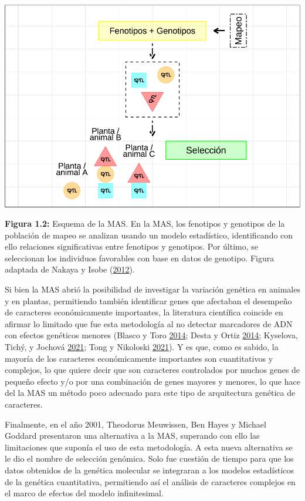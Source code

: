 \documentclass[11pt,spanish,a4paper,oneside,]{book} %
\begin{document}
\begin{center}\includegraphics[width=1\linewidth]{figures/MAS} \end{center}

\begin{center}
\textbf{Figura 1.2:} Esquema de la MAS. En la MAS, los fenotipos y genotipos de la población de mapeo se analizan usando un modelo estadístico, identificando con ello relaciones significativas entre fenotipos y genotipos. Por último, se seleccionan los individuos favorables con base en datos de genotipo. Figura adaptada de Nakaya y Isobe (\protect\hyperlink{ref-cite:6}{2012}).

\end{center}

Si bien la MAS abrió la posibilidad de investigar la variación genética en animales y en plantas, permitiendo también identificar genes que afectaban el desempeño de caracteres económicamente importantes, la literatura científica coincide en afirmar lo limitado que fue esta metodología al no detectar marcadores de ADN con efectos genéticos menores (Blasco y Toro \protect\hyperlink{ref-cite:3}{2014}; Desta y Ortiz \protect\hyperlink{ref-cite:10}{2014}; Kyselova, Tichý, y Jochová \protect\hyperlink{ref-cite:32}{2021}; Tong y Nikoloski \protect\hyperlink{ref-cite:7}{2021}). Y es que, como es sabido, la mayoría de los caracteres económicamente importantes son cuantitativos y complejos, lo que quiere decir que son caracteres controlados por muchos genes de pequeño efecto y/o por una combinación de genes mayores y menores, lo que hace del la MAS un método poco adecuado para este tipo de arquitectura genética de caracteres.

Finalmente, en el año 2001, Theodorus Meuwissen, Ben Hayes y Michael Goddard presentaron una alternativa a la MAS, superando con ello las limitaciones que suponía el uso de esta metodología. A esta nueva alternativa se le dio el nombre de selección genómica. Solo fue cuestión de tiempo para que los datos obtenidos de la genética molecular se integraran a los modelos estadísticos de la genética cuantitativa, permitiendo así el análisis de caracteres complejos en el marco de efectos del modelo infinitesimal.
\end{document}

